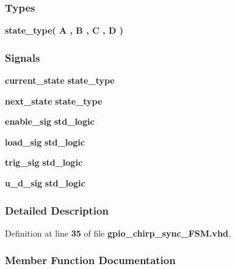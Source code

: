 \subsubsection*{Types}
 \begin{DoxyCompactItemize}
\item 
{\bfseries {\bf state\+\_\+type}{\bfseries \textcolor{vhdlchar}{(}\textcolor{vhdlchar}{ }\textcolor{vhdlchar}{A}\textcolor{vhdlchar}{ }\textcolor{vhdlchar}{,}\textcolor{vhdlchar}{ }\textcolor{vhdlchar}{B}\textcolor{vhdlchar}{ }\textcolor{vhdlchar}{,}\textcolor{vhdlchar}{ }\textcolor{vhdlchar}{C}\textcolor{vhdlchar}{ }\textcolor{vhdlchar}{,}\textcolor{vhdlchar}{ }\textcolor{vhdlchar}{D}\textcolor{vhdlchar}{ }\textcolor{vhdlchar}{)}\textcolor{vhdlchar}{ }}} 
\end{DoxyCompactItemize}
\subsubsection*{Signals}
 \begin{DoxyCompactItemize}
\item 
{\bf current\+\_\+state} {\bfseries {\bfseries {\bf state\+\_\+type}} \textcolor{vhdlchar}{ }} 
\item 
{\bf next\+\_\+state} {\bfseries {\bfseries {\bf state\+\_\+type}} \textcolor{vhdlchar}{ }} 
\item 
{\bf enable\+\_\+sig} {\bfseries \textcolor{comment}{std\+\_\+logic}\textcolor{vhdlchar}{ }} 
\item 
{\bf load\+\_\+sig} {\bfseries \textcolor{comment}{std\+\_\+logic}\textcolor{vhdlchar}{ }} 
\item 
{\bf trig\+\_\+sig} {\bfseries \textcolor{comment}{std\+\_\+logic}\textcolor{vhdlchar}{ }} 
\item 
{\bf u\+\_\+d\+\_\+sig} {\bfseries \textcolor{comment}{std\+\_\+logic}\textcolor{vhdlchar}{ }} 
\end{DoxyCompactItemize}


\subsubsection{Detailed Description}


Definition at line {\bf 35} of file {\bf gpio\+\_\+chirp\+\_\+sync\+\_\+\+F\+S\+M.\+vhd}.



\subsubsection{Member Function Documentation}
